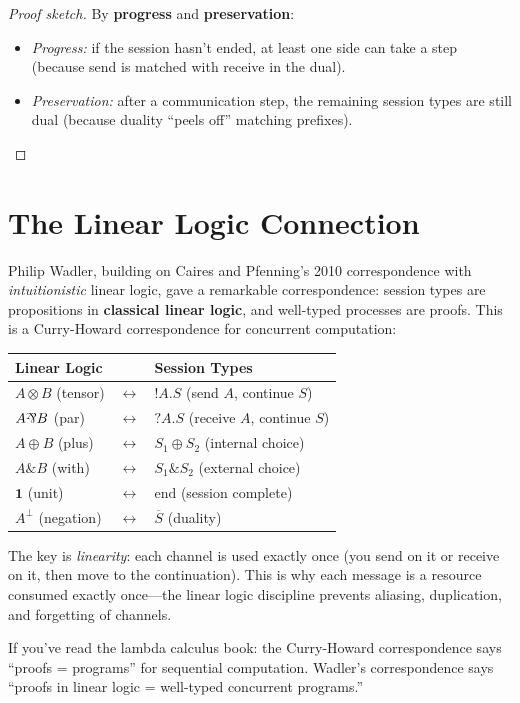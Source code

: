 \documentclass[11pt, a4paper, oneside]{book}
\newcommand{\bindnasrepma}{\rotatebox[origin=c]{180}{\&}}
\begin{document}
\begin{proof}[Proof sketch]
By \textbf{progress} and \textbf{preservation}:
\begin{itemize}[nosep]
\item \emph{Progress:} if the session hasn't ended, at least one side can
  take a step (because send is matched with receive in the dual).
\item \emph{Preservation:} after a communication step, the remaining session
  types are still dual (because duality ``peels off'' matching prefixes).
\end{itemize}
\end{proof}

\section{The Linear Logic Connection}

\begin{historical}[title={Wadler's ``Propositions as Sessions'' (2012)}]
Philip Wadler, building on Caires and Pfenning's 2010 correspondence with
\emph{intuitionistic} linear logic, gave a remarkable correspondence: session
types are propositions in \textbf{classical linear logic}, and well-typed
processes are proofs. This is a Curry-Howard correspondence for concurrent
computation:

\begin{center}
\begin{tabular}{lcl}
  \textbf{Linear Logic} & & \textbf{Session Types} \\
  \midrule
  $A \otimes B$ (tensor) & $\longleftrightarrow$ & $!A.S$ (send $A$, continue $S$) \\
  $A \bindnasrepma B$ (par) & $\longleftrightarrow$ & $?A.S$ (receive $A$, continue $S$) \\
  $A \oplus B$ (plus) & $\longleftrightarrow$ & $S_1 \oplus S_2$ (internal choice) \\
  $A \mathbin{\&} B$ (with) & $\longleftrightarrow$ & $S_1 \mathbin{\&} S_2$ (external choice) \\
  $\mathbf{1}$ (unit) & $\longleftrightarrow$ & $\text{end}$ (session complete) \\
  $A^\perp$ (negation) & $\longleftrightarrow$ & $\overline{S}$ (duality) \\
\end{tabular}
\end{center}

The key is \emph{linearity}: each channel is used exactly once (you send on it
or receive on it, then move to the continuation). This is why each message is a
resource consumed exactly once---the linear logic discipline prevents aliasing,
duplication, and forgetting of channels.

If you've read the lambda calculus book: the Curry-Howard correspondence says
``proofs = programs'' for sequential computation. Wadler's correspondence says
``proofs in linear logic = well-typed concurrent programs.''
\end{historical}
\end{document}
